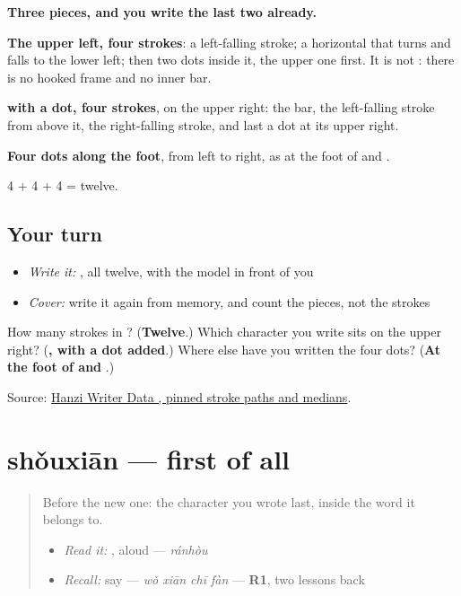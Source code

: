 \begin{quote}
\end{quote}

\textbf{Three pieces, and you write the last two already.}

\textbf{The upper left, four strokes}: a left-falling stroke; a horizontal that turns and falls to the lower left; then two dots inside it, the upper one first. It is not : there is no hooked frame and no inner bar.

\textbf{ with a dot, four strokes}, on the upper right: the bar, the left-falling stroke from above it, the right-falling stroke, and last a dot at its upper right.

\textbf{Four dots along the foot}, from left to right, as at the foot of  and .

4 + 4 + 4 = twelve.

\subsection*{Your turn}
\begin{itemize}
\raggedright
  \item \emph{Write it:} , all twelve, with the model in front of you
  \item \emph{Cover:} write it again from memory, and count the pieces, not the strokes
\end{itemize}

\begin{tcolorbox}[breakable,colback=teal!4,colframe=teal!35!black,title={Before you move on}]
How many strokes in ? (\textbf{Twelve}.) Which character you write sits on the upper right? (\textbf{, with a dot added}.) Where else have you written the four dots? (\textbf{At the foot of  and }.)

Source: \href{https://raw.githubusercontent.com/chanind/hanzi-writer-data/68d10a4b21150cae5e1ebbd223eed289cf32d90c/data/\%E7\%84\%B6.json}{Hanzi Writer Data , pinned stroke paths and medians}.
\end{tcolorbox}
\section[shǒuxiān]{shǒuxiān — first of all}

\label{lesson:ZH-C278-shouxian}



\begin{quote}
Before the new one: the character you wrote last, inside the word it belongs to.

\begin{itemize}
\raggedright
  \item \emph{Read it:} , aloud — \emph{ránhòu}
  \item \emph{Recall:} say  — \emph{wǒ xiān chī fàn} — \textbf{R1}, two lessons back
\end{itemize}
\end{quote}

